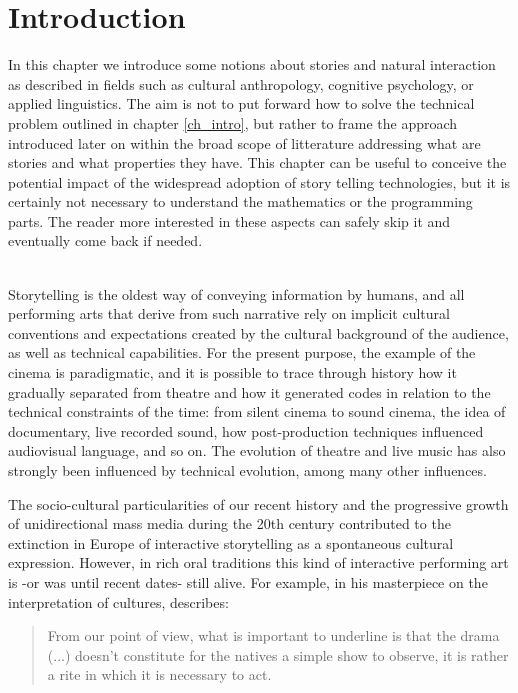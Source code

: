 \documentclass[
		twoside,openright,titlepage,numbers=noenddot,manychapters,
		headinclude,%
                footinclude=false,cleardoublepage=empty,
                BCOR=5mm,
		fontsize=11pt, %
                 enabledeprecatedfontcommands]{scrreprt}
\begin{document}
\section{Introduction}

In this chapter we introduce some notions about stories and natural interaction as described in fields such as cultural anthropology, cognitive psychology, or applied linguistics. The aim is not to put forward how to solve the technical problem outlined in chapter \ref{ch_intro}, but rather to frame the approach introduced later on within the broad scope of litterature addressing what are stories and what properties they have.
This chapter can be useful to conceive the potential impact of the widespread adoption of story telling technologies, but it is certainly not necessary to understand the mathematics or the programming parts. The reader more interested in these aspects can safely skip it and eventually come back if needed. 

\ \\
 Storytelling is the oldest way of conveying information by humans, and all performing arts that derive from such narrative rely on implicit cultural conventions and expectations created by the cultural background of the audience, as well as technical capabilities. For the present purpose, the example of the cinema is paradigmatic, and it is possible to trace through history how it gradually separated from theatre and how it generated codes in relation to the technical constraints of the time: from silent cinema to sound cinema, the idea of documentary, live recorded sound, how post-production techniques influenced audiovisual language, and so on. The evolution of theatre and live music has also strongly been influenced by technical evolution, among many other influences.

The socio-cultural particularities of our recent history and the progressive growth of unidirectional mass media during the 20th century contributed to the extinction in Europe of interactive storytelling as a spontaneous cultural expression. However, in rich oral traditions this kind of interactive performing art is -or was until recent dates- still alive. For example, in his masterpiece on the interpretation of cultures, \cite{geertz1973tdt} describes:
\begin{quote}

From our point of view, what is important to underline is that the drama (...) doesn't constitute for the natives a simple show to observe, it is rather a rite in which it is necessary to act.

\end{quote}
\end{document}

